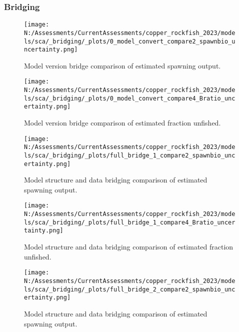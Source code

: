 \documentclass[11pt,
  english,
  letterpaper,
]{article}
\begin{document}
\hypertarget{bridging}{%
\subsubsection{Bridging}\label{bridging}}

\begin{figure}
\centering
\texttt{[image: N:/Assessments/CurrentAssessments/copper\_rockfish\_2023/models/sca/\_bridging/\_plots/0\_model\_convert\_compare2\_spawnbio\_uncertainty.png]}
\caption{Model version bridge comparison of estimated spawning output.\label{fig:bridge-ssb}}
\end{figure}

\pagebreak

\begin{figure}
\centering
\texttt{[image: N:/Assessments/CurrentAssessments/copper\_rockfish\_2023/models/sca/\_bridging/\_plots/0\_model\_convert\_compare4\_Bratio\_uncertainty.png]}
\caption{Model version bridge comparison of estimated fraction unfished.\label{fig:bridge-depl}}
\end{figure}

\pagebreak

\begin{figure}
\centering
\texttt{[image: N:/Assessments/CurrentAssessments/copper\_rockfish\_2023/models/sca/\_bridging/\_plots/full\_bridge\_1\_compare2\_spawnbio\_uncertainty.png]}
\caption{Model structure and data bridging comparison of estimated spawning output.\label{fig:data-bridge-ssb-1}}
\end{figure}

\pagebreak

\begin{figure}
\centering
\texttt{[image: N:/Assessments/CurrentAssessments/copper\_rockfish\_2023/models/sca/\_bridging/\_plots/full\_bridge\_1\_compare4\_Bratio\_uncertainty.png]}
\caption{Model structure and data bridging comparison of estimated fraction unfished.\label{fig:data-bridge-depl-1}}
\end{figure}

\pagebreak

\begin{figure}
\centering
\texttt{[image: N:/Assessments/CurrentAssessments/copper\_rockfish\_2023/models/sca/\_bridging/\_plots/full\_bridge\_2\_compare2\_spawnbio\_uncertainty.png]}
\caption{Model structure and data bridging comparison of estimated spawning output.\label{fig:data-bridge-ssb-2}}
\end{figure}
\end{document}

